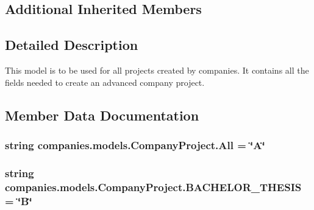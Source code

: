 \subsection*{Additional Inherited Members}


\subsection{Detailed Description}
\begin{DoxyVerb}This model is to be used for all projects created by companies.
It contains all the fields needed to create an advanced company project.
\end{DoxyVerb}
 

\subsection{Member Data Documentation}
\hypertarget{classcompanies_1_1models_1_1_company_project_a98a10cbba77cc9b523061b1ec674d636}{
\subsubsection[{All}]{\setlength{\rightskip}{0pt plus 5cm}string companies.\-models.\-Company\-Project.\-All = \char`\"{}A\char`\"{}\hspace{0.3cm}{\ttfamily [static]}}}\label{classcompanies_1_1models_1_1_company_project_a98a10cbba77cc9b523061b1ec674d636}
\hypertarget{classcompanies_1_1models_1_1_company_project_a76b6f1517299d5a23c880913b00c713f}{
\subsubsection[{B\-A\-C\-H\-E\-L\-O\-R\-\_\-\-T\-H\-E\-S\-I\-S}]{\setlength{\rightskip}{0pt plus 5cm}string companies.\-models.\-Company\-Project.\-B\-A\-C\-H\-E\-L\-O\-R\-\_\-\-T\-H\-E\-S\-I\-S = \char`\"{}B\char`\"{}\hspace{0.3cm}{\ttfamily [static]}}}\label{classcompanies_1_1models_1_1_company_project_a76b6f1517299d5a23c880913b00c713f}
